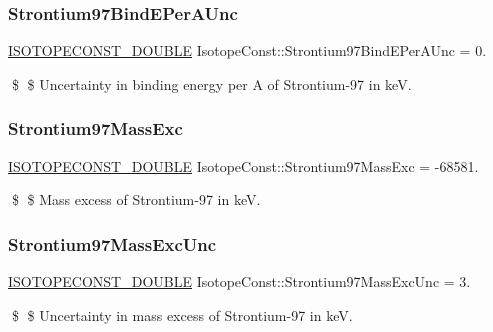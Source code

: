 \subsubsection{\texorpdfstring{Strontium97\+Bind\+E\+Per\+A\+Unc}{Strontium97BindEPerAUnc}}
{\footnotesize\ttfamily \mbox{\hyperlink{group___isotope_const-_macros_ga8f45a7272ce02c0b4c65c44636ed719a}{I\+S\+O\+T\+O\+P\+E\+C\+O\+N\+S\+T\+\_\+\+D\+O\+U\+B\+LE}} Isotope\+Const\+::\+Strontium97\+Bind\+E\+Per\+A\+Unc = 0.}

\$ \$ Uncertainty in binding energy per A of Strontium-\/97 in keV. \mbox{\label{group___isotope_const-_strontium-_sr97_ga83d19120e64ca9598be94c183ffeb3ba}} 
\subsubsection{\texorpdfstring{Strontium97\+Mass\+Exc}{Strontium97MassExc}}
{\footnotesize\ttfamily \mbox{\hyperlink{group___isotope_const-_macros_ga8f45a7272ce02c0b4c65c44636ed719a}{I\+S\+O\+T\+O\+P\+E\+C\+O\+N\+S\+T\+\_\+\+D\+O\+U\+B\+LE}} Isotope\+Const\+::\+Strontium97\+Mass\+Exc = -\/68581.}

\$ \$ Mass excess of Strontium-\/97 in keV. \mbox{\label{group___isotope_const-_strontium-_sr97_gad4954e8b0e78c3f9f48ff15b0be48e70}} 
\subsubsection{\texorpdfstring{Strontium97\+Mass\+Exc\+Unc}{Strontium97MassExcUnc}}
{\footnotesize\ttfamily \mbox{\hyperlink{group___isotope_const-_macros_ga8f45a7272ce02c0b4c65c44636ed719a}{I\+S\+O\+T\+O\+P\+E\+C\+O\+N\+S\+T\+\_\+\+D\+O\+U\+B\+LE}} Isotope\+Const\+::\+Strontium97\+Mass\+Exc\+Unc = 3.}

\$ \$ Uncertainty in mass excess of Strontium-\/97 in keV. \mbox{\label{group___isotope_const-_strontium-_sr97_ga2f7146f77e20d0fc204d35d44ddc7de0}} 
